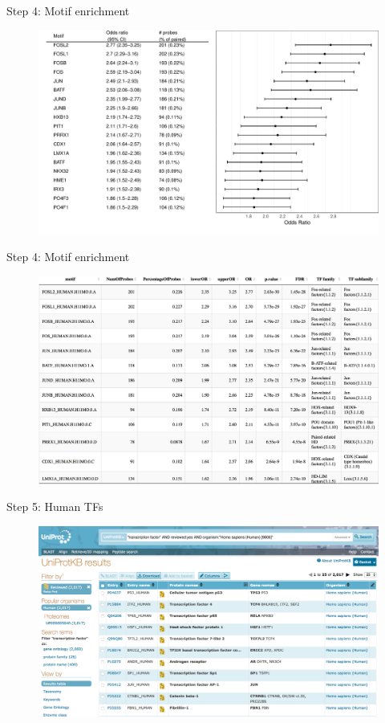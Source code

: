 \documentclass[slidestop,compress,11pt,xcolor=dvipsnames]{beamer}
\begin{document}
\begin{frame}{Step 4: Motif enrichment}
 \begin{figure}
  \centering
  \includegraphics[width=1.0\linewidth]{ELMER/motif_enrichment.pdf}
 \end{figure}
\end{frame}

\begin{frame}{Step 4: Motif enrichment}
 \begin{figure}
  \centering
  \includegraphics[width=1.0\linewidth]{ELMER/or_tbl.png}
 \end{figure}
\end{frame}


\begin{frame}{Step 5: Human TFs}
 \vspace*{-0.3cm}
 \begin{figure}
  \centering
  \includegraphics[width=1.0\linewidth]{ELMER/uniprot.png}
 \end{figure}
\end{frame}
\end{document}
